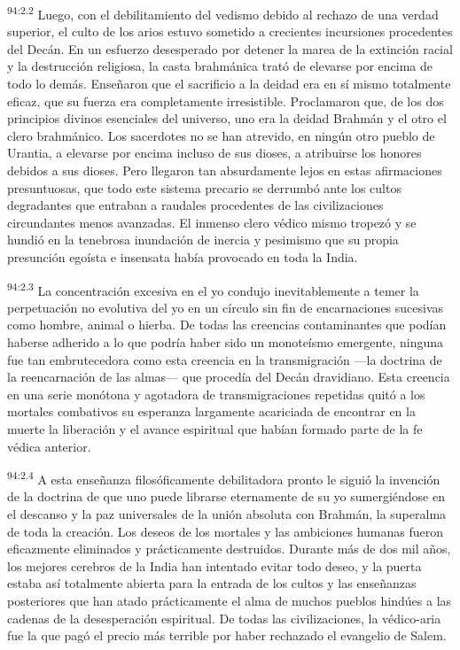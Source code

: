 \par
\textsuperscript{94:2.2} Luego, con el debilitamiento del vedismo debido al rechazo de una verdad superior, el culto de los arios estuvo sometido a crecientes incursiones procedentes del Decán. En un esfuerzo desesperado por detener la marea de la extinción racial y la destrucción religiosa, la casta brahmánica trató de elevarse por encima de todo lo demás. Enseñaron que el sacrificio a la deidad era en sí mismo totalmente eficaz, que su fuerza era completamente irresistible. Proclamaron que, de los dos principios divinos esenciales del universo, uno era la deidad Brahmán y el otro el clero brahmánico. Los sacerdotes no se han atrevido, en ningún otro pueblo de Urantia, a elevarse por encima incluso de sus dioses, a atribuirse los honores debidos a sus dioses. Pero llegaron tan absurdamente lejos en estas afirmaciones presuntuosas, que todo este sistema precario se derrumbó ante los cultos degradantes que entraban a raudales procedentes de las civilizaciones circundantes menos avanzadas. El inmenso clero védico mismo tropezó y se hundió en la tenebrosa inundación de inercia y pesimismo que su propia presunción egoísta e insensata había provocado en toda la India.

\par
\textsuperscript{94:2.3} La concentración excesiva en el yo condujo inevitablemente a temer la perpetuación no evolutiva del yo en un círculo sin fin de encarnaciones sucesivas como hombre, animal o hierba. De todas las creencias contaminantes que podían haberse adherido a lo que podría haber sido un monoteísmo emergente, ninguna fue tan embrutecedora como esta creencia en la transmigración ---la doctrina de la reencarnación de las almas--- que procedía del Decán dravidiano. Esta creencia en una serie monótona y agotadora de transmigraciones repetidas quitó a los mortales combativos su esperanza largamente acariciada de encontrar en la muerte la liberación y el avance espiritual que habían formado parte de la fe védica anterior.

\par
\textsuperscript{94:2.4} A esta enseñanza filosóficamente debilitadora pronto le siguió la invención de la doctrina de que uno puede librarse eternamente de su yo sumergiéndose en el descanso y la paz universales de la unión absoluta con Brahmán, la superalma de toda la creación. Los deseos de los mortales y las ambiciones humanas fueron eficazmente eliminados y prácticamente destruidos. Durante más de dos mil años, los mejores cerebros de la India han intentado evitar todo deseo, y la puerta estaba así totalmente abierta para la entrada de los cultos y las enseñanzas posteriores que han atado prácticamente el alma de muchos pueblos hindúes a las cadenas de la desesperación espiritual. De todas las civilizaciones, la védico-aria fue la que pagó el precio más terrible por haber rechazado el evangelio de Salem.

